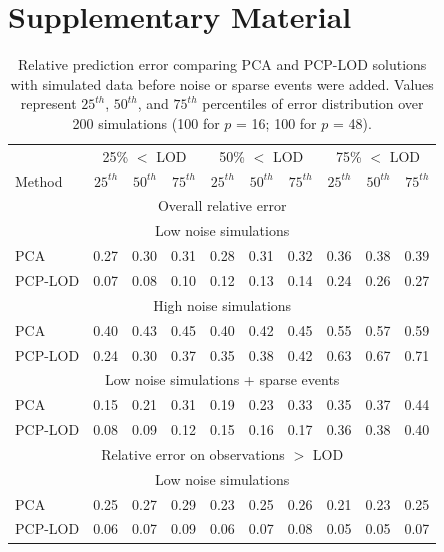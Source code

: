 {\section{Supplementary Material}
\label{sec2supp}
\begingroup
\renewcommand{\arraystretch}{1.05}
\begin{table}[!h]
\centering
\caption[Relative prediction error comparing PCA and PCP-LOD]{Relative prediction error comparing PCA and PCP-LOD solutions with simulated data before noise or sparse events were added. Values represent $25^{th}$, $50^{th}$, and $75^{th}$ percentiles of error distribution over 200 simulations (100 for $p$ = 16; 100 for $p$ = 48).}
\label{table:supp}
\begin{tabular}{lrrr|rrr|rrr}
  \hline
  \hline
 & \multicolumn{3}{c}{25\% $<$ LOD} & \multicolumn{3}{c}{50\% $<$ LOD} & \multicolumn{3}{c}{75\% $<$ LOD} \\ 
Method & $25^{th}$ & $50^{th}$ & $75^{th}$ & $25^{th}$ & $50^{th}$ & $75^{th}$ & $25^{th}$ & $50^{th}$ & $75^{th}$ \\
\hline
\multicolumn{10}{c}{Overall relative error} \\
\hline
\multicolumn{10}{c}{Low noise simulations} \\
\hline
PCA & 0.27 & 0.30 & 0.31 & 0.28 & 0.31 & 0.32 & 0.36 & 0.38 & 0.39 \\ 
PCP-LOD & 0.07 & 0.08 & 0.10 & 0.12 & 0.13 & 0.14 & 0.24 & 0.26 & 0.27 \\ 
\hline  
\multicolumn{10}{c}{High noise simulations} \\
\hline
PCA & 0.40 & 0.43 & 0.45 & 0.40 & 0.42 & 0.45 & 0.55 & 0.57 & 0.59 \\ 
PCP-LOD & 0.24 & 0.30 & 0.37 & 0.35 & 0.38 & 0.42 & 0.63 & 0.67 & 0.71 \\ 
\hline  
\multicolumn{10}{c}{Low noise simulations + sparse events} \\
\hline
PCA & 0.15 & 0.21 & 0.31 & 0.19 & 0.23 & 0.33 & 0.35 & 0.37 & 0.44 \\ 
PCP-LOD & 0.08 & 0.09 & 0.12 & 0.15 & 0.16 & 0.17 & 0.36 & 0.38 & 0.40 \\ 
\hline  
\multicolumn{10}{c}{Relative error on observations $>$ LOD} \\
\hline
\multicolumn{10}{c}{Low noise simulations} \\
\hline
PCA & 0.25 & 0.27 & 0.29 & 0.23 & 0.25 & 0.26 & 0.21 & 0.23 & 0.25 \\ 
PCP-LOD & 0.06 & 0.07 & 0.09 & 0.06 & 0.07 & 0.08 & 0.05 & 0.05 & 0.07 \\ 

\end{tabular}
\end{table}}
